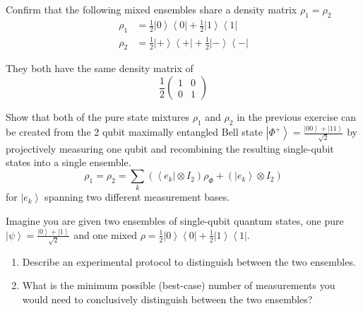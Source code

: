 \documentclass{article}
\newcommand{\ket}[1]{\ensuremath{\left|#1\right\rangle}}
\newcommand{\bra}[1]{\ensuremath{\left\langle#1\right|}}
\begin{document}
  \begin{exercise}
    Confirm that the following mixed ensembles share a density matrix $\rho_1 = \rho_2$ 
    \begin{align*}
      \rho_1 & = \frac{1}{2} \ket{0} \bra{0} + \frac{1}{2} \ket{1} \bra{1} \\
      \rho_2 & = \frac{1}{2} \ket{+} \bra{+} + \frac{1}{2} \ket{-} \bra{-}
    \end{align*}
  \end{exercise}
  \begin{solution}
    They both have the same density matrix of 
    \begin{equation}
      \frac{1}{2} \begin{pmatrix}
        1 & 0 \\ 
        0 & 1
      \end{pmatrix}
    \end{equation}
  \end{solution}

  \begin{exercise}
    Show that both of the pure state mixtures $\rho_1$ and $\rho_2$ in the previous exercise can be created from the 2 qubit maximally entangled Bell state $\ket{\Phi^+} = \frac{\ket{00} + \ket{11}}{\sqrt{2}}$ by projectively measuring one qubit and recombining the resulting single-qubit states into a single ensemble. 
    \begin{equation}
      \rho_1 = \rho_2 = \sum_k ( \bra{e_k} \otimes I_2) \rho_{\Phi} + (\ket{e_k} \otimes I_2)
    \end{equation}
    for $\ket{e_k}$ spanning two different measurement bases. 
  \end{exercise}

  \begin{exercise}
    Imagine you are given two ensembles of single-qubit quantum states, one pure $\ket{\psi} = \frac{\ket{0} + \ket{1}}{\sqrt{2}}$ and one mixed $\rho = \frac{1}{2} \ket{0} \bra{0} + \frac{1}{2} \ket{1} \bra{1}$. 
    \begin{enumerate}
      \item Describe an experimental protocol to distinguish between the two ensembles. 
      \item What is the minimum possible (best-case) number of measurements you would need to conclusively distinguish between the two ensembles? 
    \end{enumerate}
  \end{exercise}
\end{document}

